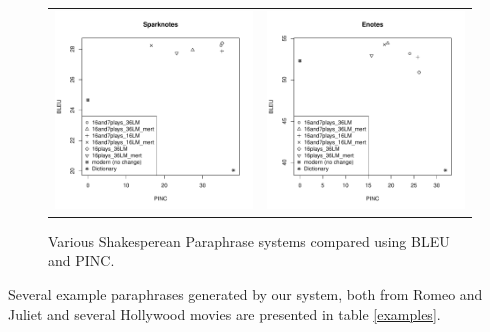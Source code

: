 \documentclass[10pt,a5paper,twoside]{article}
\begin{document}
\begin{figure}
  \begin{center}
    \begin{tabular}{cc}
      \includegraphics[width=2.4in]{figures/bleupinc1.pdf} & \includegraphics[width=2.4in]{figures/bleupinc2.pdf} \\
    \end{tabular}
  \end{center}
  \caption{Various Shakesperean Paraphrase systems compared using BLEU and PINC.}
  \label{bleupinc}
\end{figure}

Several example paraphrases generated by our system, both from Romeo and Juliet and several Hollywood movies are presented in table \ref{examples}.
\end{document}
